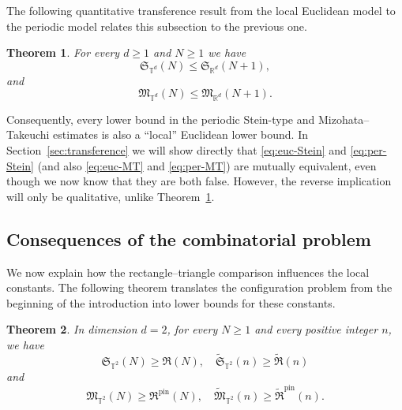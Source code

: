 \documentclass[10pt,a4paper]{amsart}
\newtheorem{theorem}{Theorem}[section]
\numberwithin{equation}{section}
\renewcommand{\le}{\leqslant}
\renewcommand{\geq}{\geqslant}
\renewcommand{\ge}{\geqslant}
\begin{document}
The following quantitative transference result from the local Euclidean model to the periodic model relates this subsection to the previous one.

\begin{theorem}\label{thm:quant-transference-intro}
For every $d\ge1$ and $N\ge1$ we have
\begin{equation}\label{eq:St-transference}
\mathfrak{S}_{\mathbb{T}^d}(N)\le \mathfrak{S}_{\mathbb{R}^d}(N+1),
\end{equation}
and
\begin{equation}\label{eq:MT-transference}
\mathfrak{M}_{\mathbb{T}^d}(N)\le \mathfrak{M}_{\mathbb{R}^d}(N+1).
\end{equation}
\end{theorem}

Consequently, every lower bound in the periodic Stein-type and Mizohata--Takeuchi estimates is also a ``local'' Euclidean lower bound.
In Section~\ref{sec:transference} we will show directly that \eqref{eq:euc-Stein} and \eqref{eq:per-Stein} (and also \eqref{eq:euc-MT} and \eqref{eq:per-MT}) are mutually equivalent, even though we now know that they are both false. However, the reverse implication will only be qualitative, unlike Theorem~\ref{thm:quant-transference-intro}.

\subsection{Consequences of the combinatorial problem}
We now explain how the rectangle--triangle comparison influences the local constants. The following theorem translates the configuration problem from the beginning of the introduction into lower bounds for these constants.

\begin{theorem}\label{thm:config-lower-intro}
In dimension $d=2$, for every $N\geq1$ and every positive integer $n$, we have
\begin{equation}\label{eq:Stein-config-lower-intro}
\mathfrak{S}_{\mathbb{T}^2}(N)\geq\mathfrak{R}(N), \quad \widetilde{\mathfrak{S}}_{\mathbb{T}^2}(n)\geq\widetilde{\mathfrak{R}}(n)
\end{equation}
and
\begin{equation}\label{eq:MT-config-lower-intro}
\mathfrak{M}_{\mathbb{T}^2}(N)\geq\mathfrak{R}^{\mathrm{pin}}(N), \quad \widetilde{\mathfrak{M}}_{\mathbb{T}^2}(n)\geq\widetilde{\mathfrak{R}}^{\mathrm{pin}}(n).
\end{equation}
\end{theorem}
\end{document}
